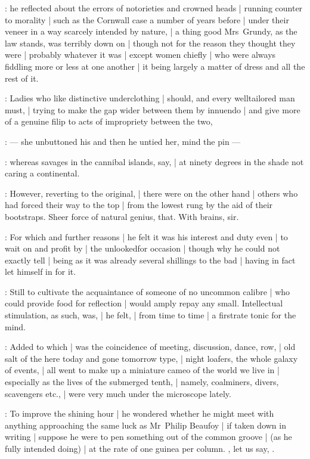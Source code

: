 :
he reflected about the errors of notorieties and crowned heads |
running counter to morality |
such as the Cornwall case a number of years before |
under their veneer in a way scarcely intended by nature, |
a thing good Mrs~Grundy, as the law stands, was terribly down on |
though not for the reason they thought they were |
probably whatever it was |
except women chiefly |
who were always fiddling more or less at one another |
it being largely a matter of dress and all the rest of it.

:
Ladies who like distinctive underclothing |
should, and every welltailored man must, |
trying to make the gap wider between them by innuendo |
and give more of a genuine filip to acts of impropriety between the two,

:
    --- she unbuttoned his and then he untied her, mind the pin ---

:
whereas savages in the cannibal islands, say, |
at ninety degrees in the shade not caring a continental.

:
However, reverting to the original, |
there were on the other hand |
others who had forced their way to the top |
from the lowest rung by the aid of their bootstraps.
Sheer force of natural genius, that.
With brains, sir.

:
For which and further reasons |
he felt it was his interest and duty even |
to wait on and profit by |
the unlookedfor occasion |
though why he could not exactly tell |
being as it was already several shillings to the bad |
having in fact let himself in for it.

:
Still to cultivate the acquaintance of someone of no uncommon calibre |
who could provide food for reflection |
would amply repay any small.
Intellectual stimulation, as such, was, |
he felt, |
from time to time |
a firstrate tonic for the mind.

:
Added to which |
was the coincidence of meeting, discussion, dance, row, |
old salt of the here today and gone tomorrow type, |
night loafers, the whole galaxy of events, |
all went to make up a miniature cameo of the world we live in |
especially as the lives of the submerged tenth, |
namely, coalminers, divers, scavengers etc., |
were very much under the microscope lately.

:
To improve the shining hour |
he wondered whether he might meet with anything
approaching the same luck as Mr~Philip Beaufoy |
if taken down in writing |
suppose he were to pen something out of the common groove |
(as he fully intended doing) |
at the rate of one guinea per column.
, let us say, .

